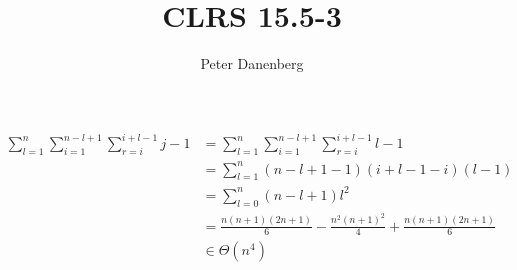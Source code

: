 \documentclass{article}
\title{CLRS 15.5-3}
\author{Peter Danenberg}
\begin{document}
\maketitle
\begin{align}
  \sum_{l=1}^n\sum_{i=1}^{n-l+1}\sum_{r=i}^{i+l-1}j-1 &=
  \sum_{l=1}^n\sum_{i=1}^{n-l+1}\sum_{r=i}^{i+l-1}l-1\\
  &= \sum_{l=1}^n(n-l+1-1)(i +l-1-i)(l-1)\\
  &= \sum_{l=0}^n(n-l+1)l^2\\
  &= \frac{n(n+1)(2n+1)}{6} - \frac{n^2(n+1)^2}{4} + \frac{n(n+1)(2n+1)}{6}\\
  &\in \Theta(n^4)
\end{align}
\end{document}
